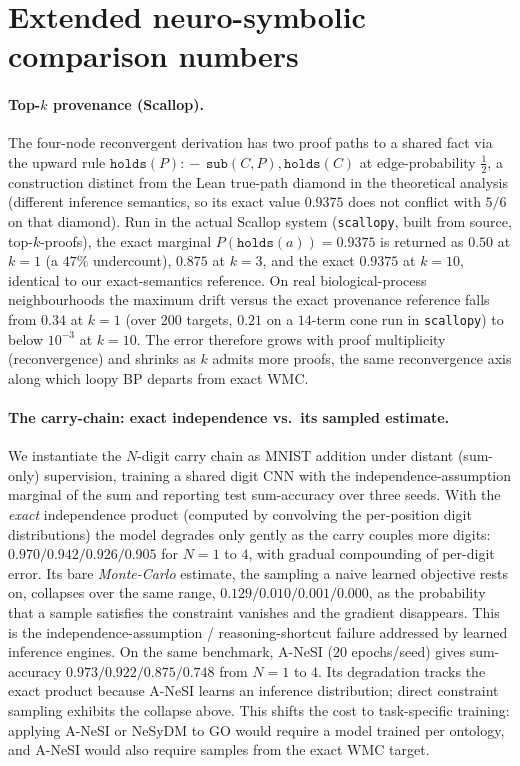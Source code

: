 \documentclass[letterpaper]{article}
\newcommand{\WMC}{\ensuremath{\mathrm{WMC}}}
\begin{document}
\section{Extended neuro-symbolic comparison numbers}\label{app:nesy}

\paragraph{Top-$k$ provenance (Scallop).}
The four-node reconvergent derivation has two proof paths to a shared fact via the upward rule $\texttt{holds}(P)\!:\!-\,\texttt{sub}(C,P),\texttt{holds}(C)$ at edge-probability $\tfrac12$, a construction distinct from the Lean true-path diamond in the theoretical analysis (different inference semantics, so its exact value $0.9375$ does not conflict with $5/6$ on that diamond). Run in the actual Scallop system (\texttt{scallopy}, built from source, top-$k$-proofs), the exact marginal $P(\texttt{holds}(a))=0.9375$ is returned as $0.50$ at $k{=}1$ (a $47\%$ undercount), $0.875$ at $k{=}3$, and the exact $0.9375$ at $k{=}10$, identical to our exact-semantics reference. On real biological-process neighbourhoods the maximum drift versus the exact provenance reference falls from $0.34$ at $k{=}1$ (over 200 targets, $0.21$ on a $14$-term cone run in \texttt{scallopy}) to below $10^{-3}$ at $k{=}10$. The error therefore grows with proof multiplicity (reconvergence) and shrinks as $k$ admits more proofs, the same reconvergence axis along which loopy BP departs from exact $\WMC$.

\paragraph{The carry-chain: exact independence vs.\ its sampled estimate.}
We instantiate the $N$-digit carry chain as MNIST addition under distant (sum-only) supervision,
training a shared digit CNN with the independence-assumption marginal of the sum and reporting
test sum-accuracy over three seeds. With the \emph{exact} independence product (computed by
convolving the per-position digit distributions) the model degrades only gently as the carry
couples more digits: $0.970/0.942/0.926/0.905$ for $N{=}1$ to $4$, with gradual compounding
of per-digit error. Its bare \emph{Monte-Carlo} estimate, the sampling a naive
learned objective rests on, collapses over the same range, $0.129/0.010/0.001/0.000$,
as the probability that a sample satisfies the constraint vanishes and the gradient disappears.
This is the independence-assumption / reasoning-shortcut failure
\citep{vankrieken2024independence,marconato2023reasoningshortcuts} addressed by learned inference
engines. On the same benchmark, A-NeSI ($20$ epochs/seed) gives sum-accuracy
$0.973/0.922/0.875/0.748$ from $N{=}1$ to $4$. Its degradation tracks the exact product because A-NeSI learns an inference distribution; direct constraint sampling exhibits the collapse above. This shifts the cost to task-specific training: applying A-NeSI or NeSyDM
\citep{vankrieken2025nesydm} to GO would require a model trained per ontology, and A-NeSI would
also require samples from the exact $\WMC$ target.
\end{document}
